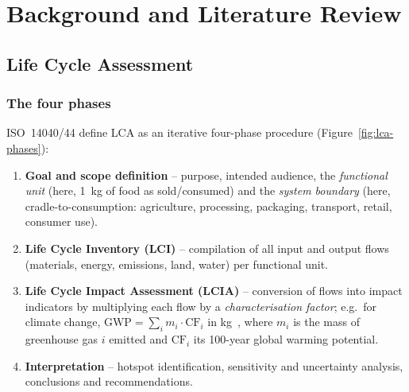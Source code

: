 \chapter{Background and Literature Review}
\label{ch:lit}

\section{Life Cycle Assessment}

\subsection{The four phases}

ISO~14040/44 define LCA as an iterative four-phase procedure \citep{iso14040,iso14044}
(Figure~\ref{fig:lca-phases}):

\begin{enumerate}
  \item \textbf{Goal and scope definition} -- purpose, intended audience, the \emph{functional
  unit} (here, 1~kg of food as sold/consumed) and the \emph{system boundary} (here,
  cradle-to-consumption: agriculture, processing, packaging, transport, retail, consumer use).
  \item \textbf{Life Cycle Inventory (LCI)} -- compilation of all input and output flows
  (materials, energy, emissions, land, water) per functional unit.
  \item \textbf{Life Cycle Impact Assessment (LCIA)} -- conversion of flows into impact indicators
  by multiplying each flow by a \emph{characterisation factor}; e.g.\ for climate change,
  $\text{GWP} = \sum_i m_i \cdot \text{CF}_i$ in kg~\co{}, where $m_i$ is the mass of greenhouse
  gas $i$ emitted and $\text{CF}_i$ its 100-year global warming potential.
  \item \textbf{Interpretation} -- hotspot identification, sensitivity and uncertainty analysis,
  conclusions and recommendations.
\end{enumerate}

